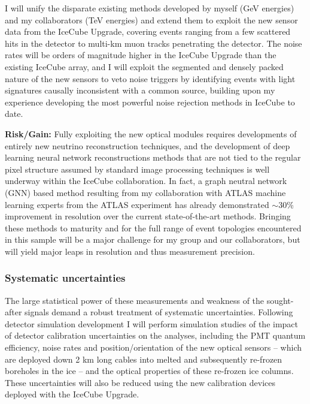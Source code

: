\documentclass[a4paper,11pt]{article}
\begin{document}
I will unify the disparate existing methods developed by myself (GeV energies) and my collaborators (TeV energies) and extend them to exploit the new sensor data from the IceCube Upgrade, covering events ranging from a few scattered hits in the detector to multi-km muon tracks penetrating the detector. The noise rates will be orders of magnitude higher in the IceCube Upgrade than the existing IceCube array, and I will exploit the segmented and densely packed nature of the new sensors to veto noise triggers by identifying events with light signatures causally inconsistent with a common source, building upon my experience developing the most powerful noise rejection methods in IceCube to date.

\textbf{Risk/Gain:} Fully exploiting the new optical modules requires developments of entirely new neutrino reconstruction techniques, and the development of deep learning neural network reconstructions methods that are not tied to the regular pixel structure assumed by standard image processing techniques is well underway within the IceCube collaboration. In fact, a graph neutral network (GNN) based method resulting from my collaboration with ATLAS machine learning experts from the ATLAS experiment has already demonstrated $\sim$30\% improvement in resolution over the current state-of-the-art methods. Bringing these methods to maturity and for the full range of event topologies encountered in this sample will be a major challenge for my group and our collaborators, but will yield major leaps in resolution and thus measurement precision. \\



\subsubsection{Systematic uncertainties}

The large statistical power of these measurements and weakness of the sought-after signals demand a robust treatment of systematic uncertainties. Following detector simulation development I will perform simulation studies of the impact of detector calibration uncertainties on the analyses, including the PMT quantum efficiency, noise rates and position/orientation of the new optical sensors -- which are deployed down 2 km long cables into melted and subsequently re-frozen boreholes in the ice -- and the optical properties of these re-frozen ice columns. These uncertainties will also be reduced using the new calibration devices deployed with the IceCube Upgrade.
\end{document}
